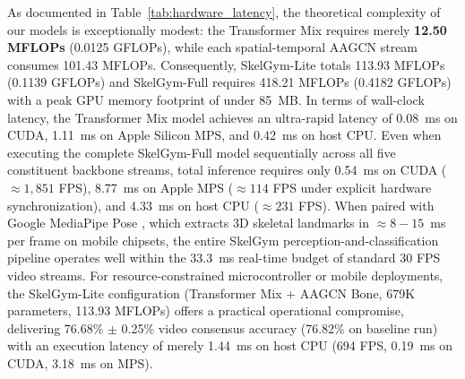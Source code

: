 \documentclass[runningheads]{llncs}
\begin{document}
As documented in Table~\ref{tab:hardware_latency}, the theoretical complexity of our models is exceptionally modest: the Transformer Mix requires merely \textbf{12.50 MFLOPs} (0.0125 GFLOPs), while each spatial-temporal AAGCN stream consumes 101.43 MFLOPs. Consequently, SkelGym-Lite totals 113.93 MFLOPs (0.1139 GFLOPs) and SkelGym-Full requires 418.21 MFLOPs (0.4182 GFLOPs) with a peak GPU memory footprint of under 85~MB.
In terms of wall-clock latency, the Transformer Mix model achieves an ultra-rapid latency of 0.08~ms on CUDA, 1.11~ms on Apple Silicon MPS, and 0.42~ms on host CPU. Even when executing the complete SkelGym-Full model sequentially across all five constituent backbone streams, total inference requires only 0.54~ms on CUDA ($\approx 1,851$ FPS), 8.77~ms on Apple MPS ($\approx 114$ FPS under explicit hardware synchronization), and 4.33~ms on host CPU ($\approx 231$ FPS). When paired with Google MediaPipe Pose \cite{chuankun2019,bazarevsky2020}, which extracts 3D skeletal landmarks in $\approx 8-15$~ms per frame on mobile chipsets, the entire SkelGym perception-and-classification pipeline operates well within the 33.3~ms real-time budget of standard 30 FPS video streams. For resource-constrained microcontroller or mobile deployments, the SkelGym-Lite configuration (Transformer Mix + AAGCN Bone, 679K parameters, 113.93 MFLOPs) offers a practical operational compromise, delivering 76.68\% $\pm$ 0.25\% video consensus accuracy (76.82\% on baseline run) with an execution latency of merely 1.44~ms on host CPU (694 FPS, 0.19~ms on CUDA, 3.18~ms on MPS).
\end{document}
